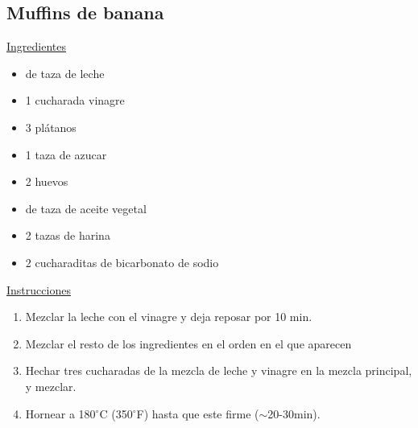 \subsection{Muffins de banana}

\underline{Ingredientes}
\begin{itemize}
\item {} de taza de leche
\item 1 cucharada vinagre
\item 3 pl\'atanos
\item 1 taza de azucar
\item 2 huevos
\item {} de taza de aceite vegetal
\item 2 tazas de harina
\item 2 cucharaditas de bicarbonato de sodio
\end{itemize}

\underline{Instrucciones}
\begin{enumerate}
\item Mezclar la leche con el vinagre y deja reposar por 10 min.
\item Mezclar el resto de los ingredientes en el orden en el que aparecen
\item Hechar tres cucharadas de la mezcla de leche y vinagre en la mezcla principal, y mezclar.
\item Hornear a 180$^\circ$C (350$^\circ$F) hasta que este firme ($\sim$20-30min).
\end{enumerate}
